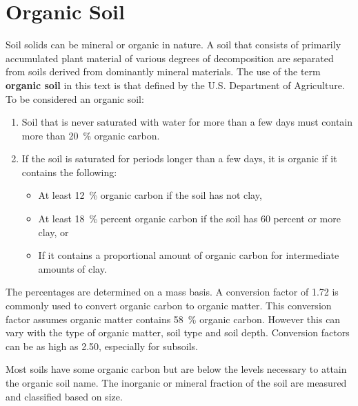 \documentclass[letterpaper, 12pt]{article}
\begin{document}


\section{Organic Soil}
\label{organic_soil}
    
Soil solids can be mineral or organic in nature. A soil that consists of primarily accumulated plant material of various degrees of decomposition are separated from soils derived from dominantly mineral materials. The use of the term \textbf{organic soil} in this text is that defined by the U.S. Department of Agriculture. To be considered an organic soil:
    
\begin{enumerate}
    \item Soil that is never saturated with water for more than a few days must contain more than \qty{20}{\percent} organic carbon.
    \item If the soil is saturated for periods longer than a few days, it is organic if it contains the following:
    \begin{itemize}
        \item At least \qty{12}{\percent} organic carbon if the soil has not clay,
        \item At least \qty{18}{\percent} percent organic carbon if the soil has 60 percent or more clay, or
        \item If it contains a proportional amount of organic carbon for intermediate amounts of clay.
    \end{itemize}
\end{enumerate}
    
The percentages are determined on a mass basis. A conversion factor of \num{1.72} is commonly used to convert organic carbon to organic matter. This conversion factor assumes organic matter contains \qty{58}{\percent} organic carbon. However this can vary with the type of organic matter, soil type and soil depth. Conversion factors can be as high as \num{2.50}, especially for subsoils.
    
Most soils have some organic carbon but are below the levels necessary to attain the organic soil name. The inorganic or mineral fraction of the soil are measured and classified based on size.
    
\end{document}
